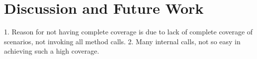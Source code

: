 \section{Discussion and Future Work}
\label{sec:discussion}

1. Reason for not having complete coverage is due to lack of complete coverage of scenarios, not invoking
all method calls.
2. Many internal calls, not so easy in achieving such a high coverage.

